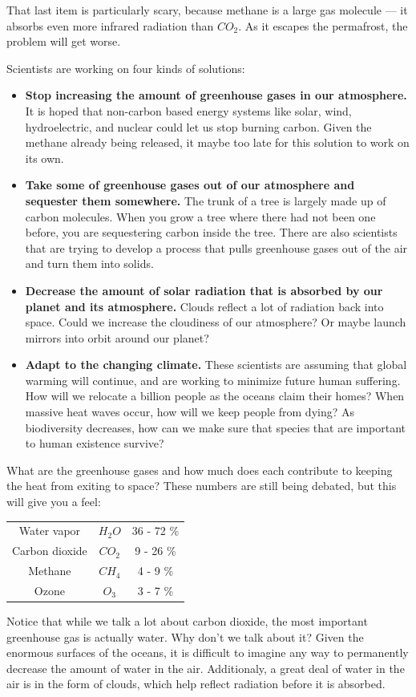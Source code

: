 That last item is particularly scary, because methane is a large gas
molecule --- it absorbs even more infrared radiation than $CO_2$. As it
escapes the permafrost, the problem will get worse.

Scientists are working on four kinds of solutions:
\begin{itemize}
  \item \textbf{Stop increasing the amount of greenhouse gases in our
    atmosphere.} It is hoped that non-carbon based energy systems like
    solar, wind, hydroelectric, and nuclear could let us stop burning
    carbon. Given the methane already being released, it maybe too
    late for this solution to work on its own.

  \item \textbf{Take some of greenhouse gases out of our atmosphere and
    sequester them somewhere.} The trunk of a tree is largely made up of carbon
    molecules. When you grow a tree where there had not been one
    before, you are sequestering carbon inside the tree.  There are
    also scientists that are trying to develop a process that pulls
    greenhouse gases out of the air and turn them into solids.

  \item \textbf{Decrease the amount of solar radiation that is
    absorbed by our planet and its atmosphere.} Clouds reflect a lot of radiation back into
    space. Could we increase the cloudiness of our atmosphere? Or
    maybe launch mirrors into orbit around our planet?

  \item \textbf{Adapt to the changing climate.} These scientists are
    assuming that global warming will continue, and are working to
    minimize future human suffering. How will we relocate a billion
    people as the oceans claim their homes?  When massive heat waves
    occur, how will we keep people from dying?  As biodiversity
    decreases, how can we make sure that species that are important to
    human existence survive?
    
\end{itemize}

What are the greenhouse gases and how much does each contribute to
keeping the heat from exiting to space?  These numbers are still being
debated, but this will give you a feel:
\begin{tabular}{c | c | c}
  Water vapor & $H_2O$ & 36 - 72 \% \\
  Carbon dioxide & $CO_2$ & 9 - 26 \% \\
  Methane & $CH_4$ & 4 - 9 \% \\
  Ozone & $O_3$ & 3 - 7 \%
\end{tabular}

Notice that while we talk a lot about carbon dioxide, the most
important greenhouse gas is actually water.  Why don't we talk about
it? Given the enormous surfaces of the oceans, it is difficult to
imagine any way to permanently decrease the amount of water in the
air. Additionaly, a great deal of water in the air is in the form of clouds, which
help reflect radiation before it is absorbed.

